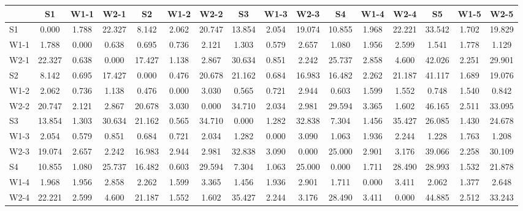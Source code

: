 \begin{table*}[h!]
\begin{center}
\begin{tabular}{| l | c | c | c | c | c | c | c | c | c | c | c | c | c | c | c |}\hline
 & S1 & W1-1 & W2-1 & S2 & W1-2 & W2-2 & S3 & W1-3 & W2-3 & S4 & W1-4 & W2-4 & S5 & W1-5 & W2-5 \\\hline
S1 & 0.000  & 1.788  & 22.327  & 8.142  & 2.062  & 20.747  & 13.854  & 2.054  & 19.074  & 10.855  & 1.968  & 22.221  & 33.542  & 1.702  & 19.829 \\\hline
W1-1 & 1.788  & 0.000  & 0.638  & 0.695  & 0.736  & 2.121  & 1.303  & 0.579  & 2.657  & 1.080  & 1.956  & 2.599  & 1.541  & 1.778  & 1.129 \\\hline
W2-1 & 22.327  & 0.638  & 0.000  & 17.427  & 1.138  & 2.867  & 30.634  & 0.851  & 2.242  & 25.737  & 2.858  & 4.600  & 42.026  & 2.251  & 29.901 \\\hline
S2 & 8.142  & 0.695  & 17.427  & 0.000  & 0.476  & 20.678  & 21.162  & 0.684  & 16.983  & 16.482  & 2.262  & 21.187  & 41.117  & 1.689  & 19.076 \\\hline
W1-2 & 2.062  & 0.736  & 1.138  & 0.476  & 0.000  & 3.030  & 0.565  & 0.721  & 2.944  & 0.603  & 1.599  & 1.552  & 0.748  & 1.540  & 0.842 \\\hline
W2-2 & 20.747  & 2.121  & 2.867  & 20.678  & 3.030  & 0.000  & 34.710  & 2.034  & 2.981  & 29.594  & 3.365  & 1.602  & 46.165  & 2.511  & 33.095 \\\hline
S3 & 13.854  & 1.303  & 30.634  & 21.162  & 0.565  & 34.710  & 0.000  & 1.282  & 32.838  & 7.304  & 1.456  & 35.427  & 26.085  & 1.430  & 24.678 \\\hline
W1-3 & 2.054  & 0.579  & 0.851  & 0.684  & 0.721  & 2.034  & 1.282  & 0.000  & 3.090  & 1.063  & 1.936  & 2.244  & 1.228  & 1.763  & 1.208 \\\hline
W2-3 & 19.074  & 2.657  & 2.242  & 16.983  & 2.944  & 2.981  & 32.838  & 3.090  & 0.000  & 25.000  & 2.901  & 3.176  & 39.066  & 2.258  & 30.109 \\\hline
S4 & 10.855  & 1.080  & 25.737  & 16.482  & 0.603  & 29.594  & 7.304  & 1.063  & 25.000  & 0.000  & 1.711  & 28.490  & 28.993  & 1.532  & 21.878 \\\hline
W1-4 & 1.968  & 1.956  & 2.858  & 2.262  & 1.599  & 3.365  & 1.456  & 1.936  & 2.901  & 1.711  & 0.000  & 3.411  & 2.062  & 1.377  & 2.648 \\\hline
W2-4 & 22.221  & 2.599  & 4.600  & 21.187  & 1.552  & 1.602  & 35.427  & 2.244  & 3.176  & 28.490  & 3.411  & 0.000  & 44.885  & 2.512  & 33.243 \\\hline

\end{tabular}
\end{center}
\end{table*}
